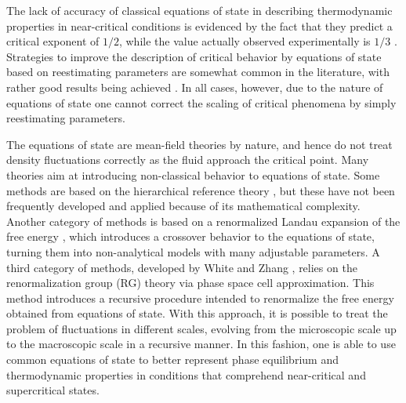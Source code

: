 \documentclass[preprint,12pt,3p]{elsarticle}
\begin{document}
The lack of accuracy of classical equations of state in describing thermodynamic properties in near-critical conditions is evidenced by the fact that they predict a critical exponent of $1/2$, while the value actually observed experimentally is $1/3$ \cite{sengers1974van,wyczalkowska2004critical,stanley1999scaling}.
Strategies to improve the description of critical behavior by equations of state based on reestimating parameters are somewhat common in the literature, with rather good results being achieved \cite{palma2017re,vinhal2017evaluation}.
In all cases, however, due to the nature of equations of state one cannot correct the scaling of critical phenomena by simply reestimating parameters.

The equations of state are mean-field theories by nature, and hence do not treat density fluctuations correctly as the fluid approach the critical point.
Many theories aim at introducing non-classical behavior to equations of state.
Some methods are based on the hierarchical reference theory \cite{parola1984liquid, parola1985hierarchical, meroni1990differential, meroni1993differential}, but these have not been frequently developed and applied because of its mathematical complexity.
Another category of methods is based on a renormalized Landau expansion of the free energy \cite{wyczalkowska2004critical, chen1990crossover, kiselev1991universal, kiselev1998cubic, anisimov1992crossover, kiselev1999cubic, kiselev1999crossover}, which introduces a crossover behavior to the equations of state, turning them into non-analytical models with many adjustable parameters.
A third category of methods, developed by White and Zhang \cite{white1993renormalization, white1995renormalization, white1998renormalization}, relies on the renormalization group (RG) theory via phase space cell approximation.
This method introduces a recursive procedure intended to renormalize the free energy obtained from equations of state.
With this approach, it is possible to treat the problem of fluctuations in different scales, evolving from the microscopic scale up to the macroscopic scale in a recursive manner.
In this fashion, one is able to use common equations of state to better represent phase equilibrium and thermodynamic properties in conditions that comprehend near-critical and supercritical states.
\end{document}
